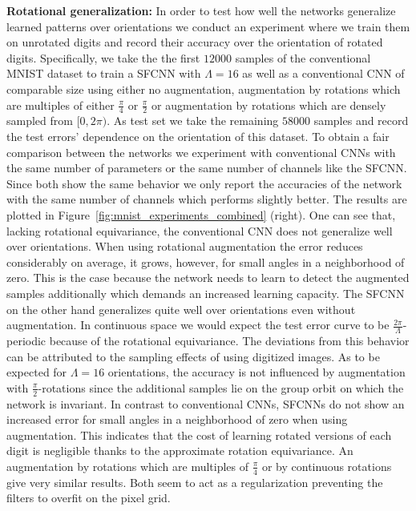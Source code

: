 \documentclass[10pt,twocolumn,letterpaper]{article}
\newcommand{\myparagraph}[1]{\vspace*{1ex}\noindent\textbf{#1}}
\begin{document}
\myparagraph{Rotational generalization:}
In order to test how well the networks generalize learned patterns over orientations we conduct an experiment where we train them on unrotated digits and record their accuracy over the orientation of rotated digits.
Specifically, we take the the first $12000$ samples of the conventional MNIST dataset to train a \mbox{SFCNN} with $\Lambda=16$ as well as a conventional CNN of comparable size using either no augmentation, augmentation by rotations which are multiples of either $\frac{\pi}{4}$ or $\frac{\pi}{2}$ or augmentation by rotations which are densely sampled from $[0,2\pi)$.
As test set we take the remaining $58000$ samples and record the test errors' dependence on the orientation of this dataset.
To obtain a fair comparison between the networks we experiment with conventional CNNs with the same number of parameters or the same number of channels like the \mbox{SFCNN}.
Since both show the same behavior we only report the accuracies of the network with the same number of channels which performs slightly better.
The results are plotted in Figure~\ref{fig:mnist_experiments_combined} (right).
One can see that, lacking rotational equivariance, the conventional CNN does not generalize well over orientations.
When using rotational augmentation the error reduces considerably on average, it grows, however, for small angles in a neighborhood of zero.
This is the case because the network needs to learn to detect the augmented samples additionally which demands an increased learning capacity.
The \mbox{SFCNN} on the other hand generalizes quite well over orientations even without augmentation.
In continuous space we would expect the test error curve to be $\frac{2\pi}{\Lambda}$-periodic because of the rotational equivariance.
The deviations from this behavior can be attributed to the sampling effects of using digitized images.
As to be expected for $\Lambda=16$ orientations, the accuracy is not influenced by augmentation with $\frac{\pi}{2}$-rotations since the additional samples lie on the group orbit on which the network is invariant.
In contrast to conventional CNNs, \mbox{SFCNNs} do not show an increased error for small angles in a neighborhood of zero when using augmentation.
This indicates that the cost of learning rotated versions of each digit is negligible thanks to the approximate rotation equivariance.
An augmentation by rotations which are multiples of $\frac{\pi}{4}$ or by continuous rotations give very similar results.
Both seem to act as a regularization preventing the filters to overfit on the pixel grid.
\end{document}
